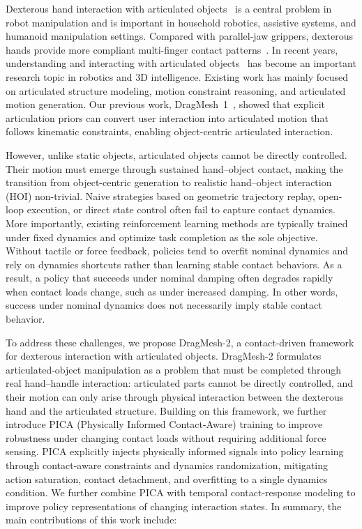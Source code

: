 \documentclass{llmxive}
\begin{document}
Dexterous hand interaction with articulated objects~\cite{okami2024,bao2023dexart,jing2025humanoidgen,lu2025h,lee2025stageact,wang2026paws} is a central problem in robot manipulation and is important in household robotics, assistive systems, and humanoid manipulation settings. Compared with parallel-jaw grippers, dexterous hands provide more compliant multi-finger contact patterns~\cite{liu2023dexrepnet,xu2026contact,dexvla2025}. In recent years, understanding and interacting with articulated objects~\cite{gao2025partrm,liu2025building,le2025articulate,wu2026dipo,wang2025adamanip,wu2022vatmart,Wang2025articubot,zhao2025tac} has become an important research topic in robotics and 3D intelligence. Existing work has mainly focused on articulated structure modeling, motion constraint reasoning, and articulated motion generation. Our previous work, DragMesh~1~\cite{zhang2025dragmesh}, showed that explicit articulation priors can convert user interaction into articulated motion that follows kinematic constraints, enabling object-centric articulated interaction.

However, unlike static objects, articulated objects cannot be directly controlled. Their motion must emerge through sustained hand--object contact, making the transition from object-centric generation to realistic hand--object interaction (HOI) non-trivial. Naive strategies based on geometric trajectory replay, open-loop execution, or direct state control often fail to capture contact dynamics. More importantly, existing reinforcement learning methods are typically trained under fixed dynamics and optimize task completion as the sole objective. Without tactile or force feedback, policies tend to overfit nominal dynamics and rely on dynamics shortcuts rather than learning stable contact behaviors. As a result, a policy that succeeds under nominal damping often degrades rapidly when contact loads change, such as under increased damping. In other words, success under nominal dynamics does not necessarily imply stable contact behavior.

To address these challenges, we propose DragMesh-2, a contact-driven framework for dexterous interaction with articulated objects. DragMesh-2 formulates articulated-object manipulation as a problem that must be completed through real hand--handle interaction: articulated parts cannot be directly controlled, and their motion can only arise through physical interaction between the dexterous hand and the articulated structure. Building on this framework, we further introduce PICA (Physically Informed Contact-Aware) training to improve robustness under changing contact loads without requiring additional force sensing. PICA explicitly injects physically informed signals into policy learning through contact-aware constraints and dynamics randomization, mitigating action saturation, contact detachment, and overfitting to a single dynamics condition. We further combine PICA with temporal contact-response modeling to improve policy representations of changing interaction states. In summary, the main contributions of this work include:
\end{document}
